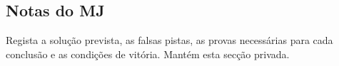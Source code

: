 \subsection{Notas do MJ}
Regista a solução prevista, as falsas pistas, as provas necessárias para cada conclusão e as condições de vitória. Mantém esta secção privada.
